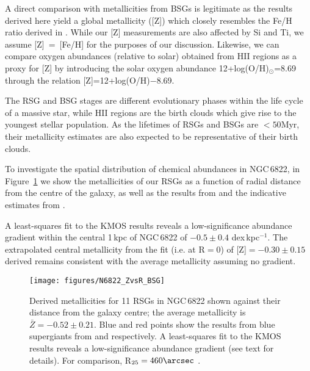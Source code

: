 \documentclass[iop]{emulateapj}
\begin{document}
A direct comparison with metallicities from BSGs is legitimate as the results derived here yield a global metallicity ([Z]) which
closely resembles the Fe/H ratio derived in
\cite{2001ApJ...547..765V}.
While our [Z] measurements are also affected by Si and Ti,
we assume [Z]~=~[Fe/H] for the purposes of our discussion.
Likewise, we can compare oxygen abundances (relative to solar) obtained from HII regions as a proxy for [Z] by
introducing the solar oxygen abundance
{12+log(O/H)}$_{\odot}$=8.69
\citep{2009ARA&A..47..481A} through the relation
[Z]=12+log(O/H)$-$8.69.

The RSG and BSG stages are different evolutionary phases within the life cycle of a massive star,
while HII regions are the birth clouds which give rise to the youngest stellar population.
As the lifetimes of RSGs and BSGs are $<50$Myr,
their metallicity estimates are also expected to be representative of their birth clouds.

To investigate the spatial distribution of chemical abundances in NGC\,6822,
in Figure~\ref{fig:ZvsR}
we show the metallicities of our RSGs as a function of radial distance from the centre of the galaxy,
as well as the results from
\cite{2001ApJ...547..765V} and the indicative estimates from
\cite{1999A&A...352L..40M}.

A least-squares fit to the KMOS results reveals a low-significance abundance gradient within the central 1\,kpc of NGC\,6822 of $-0.5\pm0.4$ dex\,kpc$^{-1}$.
The extrapolated central metallicity from the fit (i.e. at R$=$0) of [Z]$=-0.30\pm0.15$ derived remains consistent with the average metallicity assuming no gradient.

\begin{figure}
\texttt{[image: figures/N6822\_ZvsR\_BSG]}
\caption{
Derived metallicities for 11 RSGs in NGC\,6822 shown against their distance from the galaxy centre;
the average metallicity is
$\bar{Z} = -0.52\pm 0.21$.
Blue and red points show the results from blue supergiants from
\protect\cite{2001ApJ...547..765V} and
\protect\cite{2001ApJ...547..765V} respectively.
A least-squares fit to the KMOS results reveals a low-significance abundance gradient
(see text for details).
For comparison,
R$_{25} = 460\arcsec$
\citep[$=1.02$\,kpc;][]{2012AJ....144....4M}.
        }
\label{fig:ZvsR}
\end{figure}
\end{document}
